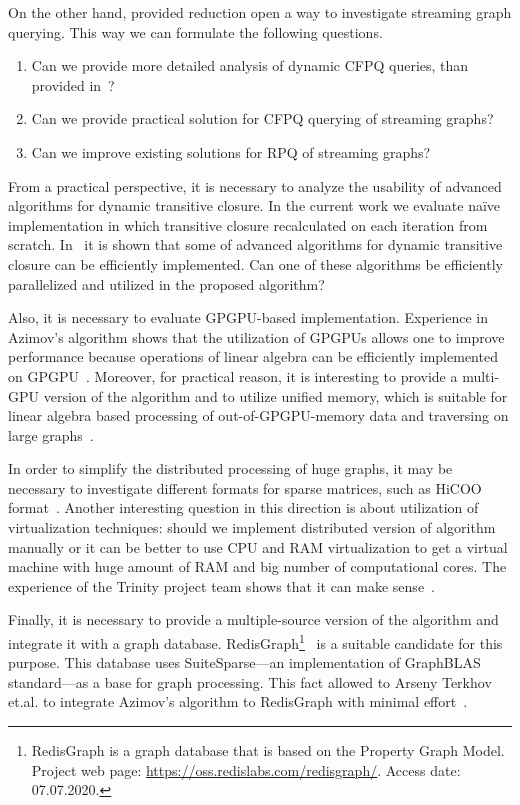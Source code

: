 On the other hand, provided reduction open a way to investigate streaming graph querying.
This way we can formulate the following questions.
\begin{enumerate}
\item Can we provide more detailed analysis of dynamic CFPQ queries, than provided in~\cite{10.1007/978-3-662-54458-7_16}?
\item Can we provide practical solution for CFPQ querying of streaming graphs?
\item Can we improve existing solutions for RPQ of streaming graphs?
\end{enumerate}

From a practical perspective, it is necessary to analyze the usability of advanced algorithms for dynamic transitive closure.
In the current work we evaluate na{\"i}ve implementation in which transitive closure recalculated on each iteration from scratch.
In~\cite{cs6345} it is shown that some of advanced algorithms for dynamic transitive closure can be efficiently implemented.
Can one of these algorithms be efficiently parallelized and utilized in the proposed algorithm?

Also, it is necessary to evaluate GPGPU-based implementation.
Experience in Azimov's algorithm shows that the utilization of GPGPUs allows one to improve performance because operations of linear algebra can be efficiently implemented on GPGPU~\cite{Mishin:2019:ECP:3327964.3328503,10.1145/3398682.3399163}. 
Moreover, for practical reason, it is interesting to provide a multi-GPU version of the algorithm and to utilize unified memory, which is suitable for linear algebra based processing of out-of-GPGPU-memory data and traversing on large graphs~\cite{8946118,10.14778/3384345.3384358}.

In order to simplify the distributed processing of huge graphs, it may be necessary to investigate different formats for sparse matrices, such as HiCOO format~\cite{10.5555/3291656.3291682}. 
Another interesting question in this direction is about utilization of virtualization techniques: should we implement distributed version of algorithm manually or it can be better to use CPU and RAM virtualization to get a virtual machine with huge amount of RAM and big number of computational cores. 
The experience of the Trinity project team shows that it can make sense~\cite{10.1145/2463676.2467799}. 

Finally, it is necessary to provide a multiple-source version of the algorithm and integrate it with a graph database.
RedisGraph\footnote{RedisGraph is a graph database that is based on the Property Graph
Model. Project web page: \url{https://oss.redislabs.com/redisgraph/}. Access date:
07.07.2020.}~\cite{8778293} is a suitable candidate for this purpose.
This database uses SuiteSparse---an implementation of GraphBLAS standard---as a base for graph processing.
This fact allowed to Arseny Terkhov et.al.  to integrate Azimov's algorithm to RedisGraph with minimal effort~\cite{10.1145/3398682.3399163}.
